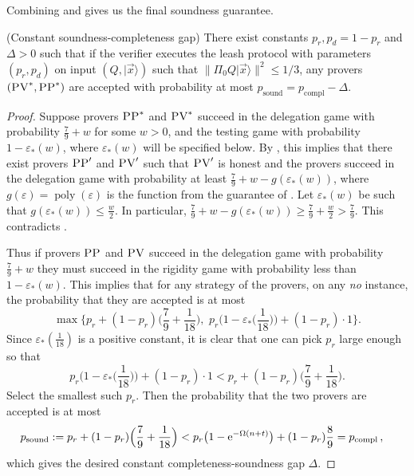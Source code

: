 \documentclass{toc}
\newcommand{\ket}[1]{|#1\rangle}
\DeclareMathOperator{\poly}{poly}
\DeclareMathOperator{\sound}{sound}
\DeclareMathOperator{\compl}{compl}
\newcommand{\eps}{\varepsilon}
\newcommand{\pv}{\textsc{PV}}
\newcommand{\pp}{\textsc{PP}}
\begin{document}
\noindent Combining  and  gives us the final soundness guarantee.

\begin{lemma}\label{lem:leash-soundness} (Constant soundness-completeness gap)
There exist constants $p_r,p_d=1-p_r$ and $\Delta>0$ such that if the verifier executes the leash protocol with parameters $(p_r,p_d)$ on input $(Q,\ket{\vec{x}})$ such that $\|\Pi_0 Q\ket{\vec{x}}\|^2 \leq 1/3$, any provers $(\pv^*,\pp^*)$ are accepted with probability at most \mbox{$p_{\sound}=p_{\compl}-\Delta$}.  
\end{lemma}

\begin{proof}
Suppose provers $\pp^*$ and $\pv^*$ succeed in the delegation game with probability $\frac79+w$ for some $w>0$, and the testing game with probability $1-\eps_*(w)$, where $\eps_*(w)$ will be specified below. By , this implies that there exist provers $\pp'$ and $\pv'$ such that $\pv'$ is honest and the provers succeed in the delegation game with probability at least $\frac79+w-g(\eps_*(w))$, where $g(\eps) = \poly(\eps)$ is the function from the guarantee of . Let $\eps_*(w)$ be such that $g(\eps_*(w)) \leq \frac{w}{2}$. In particular, $\frac79+w-g(\eps_*(w)) \geq \frac79+\frac{w}{2}>\frac79$. This contradicts . 

Thus if provers $\pp$ and $\pv$ succeed in the delegation game with probability $\frac79+w$ they must succeed in the rigidity game with probability less than $1-\eps_*(w)$. 
This implies that for any strategy of the provers, on any \textit{no} instance, the probability that they are accepted is at most
\begin{equation}
\max\Big\{p_r+(1-p_r)\Big(\frac79+\frac{1}{18}\Big),\,\, p_r\Big(1-\eps_*\Big(\frac{1}{18}\Big)\Big)+(1-p_r)\cdot 1\Big\}.
\end{equation}
Since $\eps_*(\frac{1}{18})$ is a positive constant, it is clear that one can pick $p_r$ large enough so that 
\begin{equation}
p_r\Big(1-\eps_*\Big(\frac{1}{18}\Big)\Big)+(1-p_r)\cdot 1 < p_r+(1-p_r)\Big(\frac79+\frac{1}{18}\Big).
\end{equation}
Select the smallest such $p_r$. Then the probability that the two provers are accepted is at most 
\begin{align*}
p_{\sound} &:= p_r+(1-p_r)\Big(\frac79+\frac{1}{18}\Big)
< p_r\big(1-\eee^{-\Omega(n+t)}\big)+(1-p_r)\frac89 
= p_{\compl} \,,
\end{align*}
which gives the desired constant completeness-soundness gap $\Delta$.
\end{proof}
\end{document}
